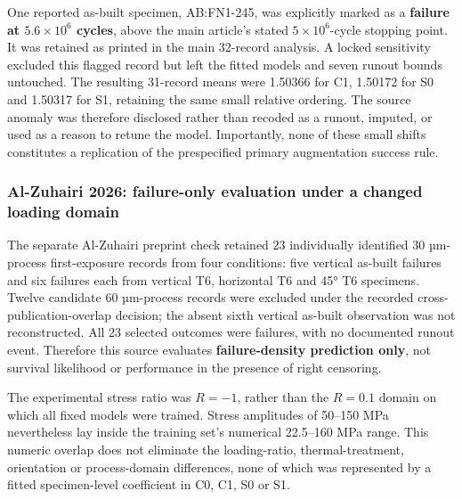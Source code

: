 \documentclass[12pt,a4paper]{article}
\begin{document}
One reported as-built specimen, AB:FN1-245, was explicitly marked as a \textbf{failure at \(5.6\times10^6\) cycles}, above the main article's stated \(5\times10^6\)-cycle stopping point. It was retained as printed in the main 32-record analysis. A locked sensitivity excluded this flagged record but left the fitted models and seven runout bounds untouched. The resulting 31-record means were 1.50366 for C1, 1.50172 for S0 and 1.50317 for S1, retaining the same small relative ordering. The source anomaly was therefore disclosed rather than recoded as a runout, imputed, or used as a reason to retune the model. Importantly, none of these small shifts constitutes a replication of the prespecified primary augmentation success rule.

\subsubsection{Al-Zuhairi 2026: failure-only evaluation under a changed loading domain}

The separate Al-Zuhairi preprint check retained 23 individually identified 30 µm-process first-exposure records from four conditions: five vertical as-built failures and six failures each from vertical T6, horizontal T6 and 45° T6 specimens. Twelve candidate 60 µm-process records were excluded under the recorded cross-publication-overlap decision; the absent sixth vertical as-built observation was not reconstructed. All 23 selected outcomes were failures, with no documented runout event. Therefore this source evaluates \textbf{failure-density prediction only}, not survival likelihood or performance in the presence of right censoring.

The experimental stress ratio was \(R=-1\), rather than the \(R=0.1\) domain on which all fixed models were trained. Stress amplitudes of 50–150 MPa nevertheless lay inside the training set's numerical 22.5–160 MPa range. This numeric overlap does not eliminate the loading-ratio, thermal-treatment, orientation or process-domain differences, none of which was represented by a fitted specimen-level coefficient in C0, C1, S0 or S1.
\end{document}
